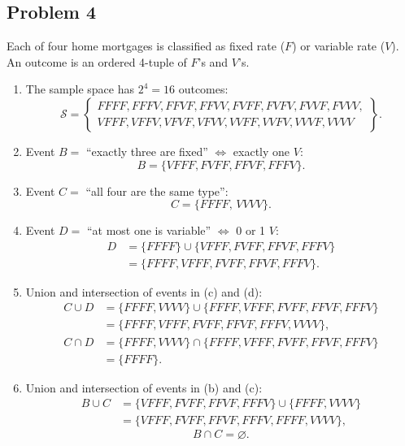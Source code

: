 \documentclass{article}
\begin{document}
\subsection*{Problem 4}

Each of four home mortgages is classified as fixed rate ($F$) or variable rate ($V$). An outcome is an ordered
4-tuple of $F$'s and $V$'s.

\begin{enumerate}
\item[(a)] The sample space has $2^4=16$ outcomes:
\[
\mathcal{S}=\left\{\begin{array}{l}
FFFF,FFFV,FFVF,FFVV,FVFF,FVFV,FVVF,FVVV,\\
VFFF,VFFV,VFVF,VFVV,VVFF,VVFV,VVVF,VVVV
\end{array}\right\}.
\]

\item[(b)] Event $B=$ ``exactly three are fixed'' $\iff$ exactly one $V$:
\[
B=\{VFFF,FVFF,FFVF,FFFV\}.
\]

\item[(c)] Event $C=$ ``all four are the same type'':
\[
C=\{FFFF,\,VVVV\}.
\]

\item[(d)] Event $D=$ ``at most one is variable'' $\iff$ 0 or 1 $V$:
\[
\begin{aligned}
D &= \{FFFF\}\cup\{VFFF,FVFF,FFVF,FFFV\}\\
  &= \{FFFF,VFFF,FVFF,FFVF,FFFV\}.
\end{aligned}
\]

\item[(e)] Union and intersection of events in (c) and (d):
\[
\begin{aligned}
C\cup D
&= \{FFFF,VVVV\}\cup\{FFFF,VFFF,FVFF,FFVF,FFFV\}\\
&= \{FFFF,VFFF,FVFF,FFVF,FFFV,VVVV\},
\end{aligned}
\]
\[
\begin{aligned}
C\cap D
&= \{FFFF,VVVV\}\cap\{FFFF,VFFF,FVFF,FFVF,FFFV\}\\
&= \{FFFF\}.
\end{aligned}
\]

\item[(f)] Union and intersection of events in (b) and (c):
\[
\begin{aligned}
B\cup C
&= \{VFFF,FVFF,FFVF,FFFV\}\cup\{FFFF,VVVV\}\\
&= \{VFFF,FVFF,FFVF,FFFV,FFFF,VVVV\},
\end{aligned}
\]
\[
B\cap C=\varnothing.
\]
\end{enumerate}
\end{document}
